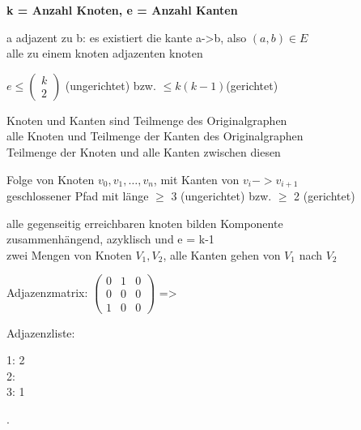%


\textbf{k = Anzahl Knoten, e = Anzahl Kanten}

a adjazent zu b: es existiert die kante a->b, also $(a,b) \in E$\\
 alle zu einem knoten adjazenten knoten

$e \leq \left( \! \begin{array}{c}k \\ 2\end{array} \! \right)$ (ungerichtet) bzw. $\leq k(k-1)$(gerichtet)



 Knoten und Kanten sind Teilmenge des Originalgraphen\\
 alle Knoten und Teilmenge der Kanten des Originalgraphen\\
 Teilmenge der Knoten und alle Kanten zwischen diesen

 Folge von Knoten $v_0,v_1,\dots,v_n$, mit Kanten von $v_i -> v_{i+1}$\\
 geschlossener Pfad mit länge $\geq$ 3 (ungerichtet) bzw. $\geq$ 2 (gerichtet)

 alle gegenseitig erreichbaren knoten bilden Komponente\\
 zusammenhängend, azyklisch und e = k-1\\
 zwei Mengen von Knoten $V_1, V_2$, alle Kanten gehen von $V_1$ nach $V_2$

Adjazenzmatrix: $\left(
\begin{matrix}
0 & 1& 0\\
0 & 0 & 0 \\
1 & 0 & 0 
\end{matrix}
 \right)$ => 
\begin{minipage}{0.1\textwidth}
\end{minipage}
Adjazenzliste: 
\begin{minipage}[c]{0.1\textwidth}
1: 2\\
2:\\
3: 1 \\
\end{minipage}.

